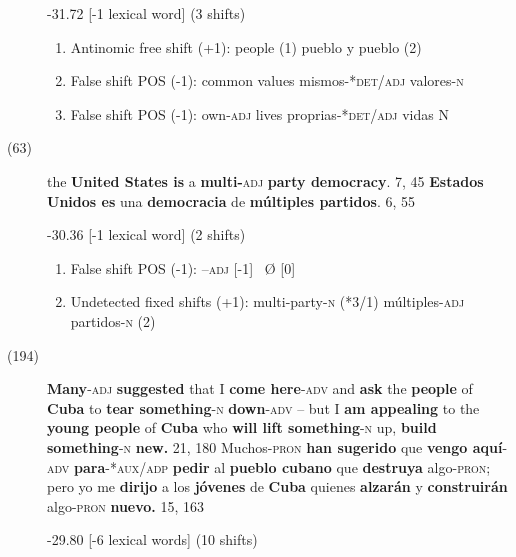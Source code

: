 \documentclass[output=paper]{langsci/langscibook}
\begin{document}
\begin{description}
    -31.72 [-1 lexical word] (3 shifts)

    \begin{enumerate}
      \item Antinomic free shift (+1): people (1) \rightarrow pueblo y pueblo (2)
      \item False shift POS (-1): common values \rightarrow mismos-*\textsc{det/adj} valores-\textsc{n}
      \item False shift POS (-1): own\textsc{-adj} lives \rightarrow proprias-*\textsc{det/adj} vidas N
    \end{enumerate}

  \item[(63)] the \textbf{United States is} a \textbf{multi-}\textsc{adj} \textbf{party democracy}. 7, 45 \rightarrow \textbf{Estados Unidos es} una \textbf{democracia} de \textbf{múltiples partidos}. 6, 55

    -30.36 [-1 lexical word] (2 shifts)

    \begin{enumerate}
      \item False shift POS (-1): --\textsc{adj} [-1] \ \rightarrow Ø [0]
      \item Undetected fixed shifts (+1): multi-party-\textsc{n} (*3/1) \rightarrow múltiples-\textsc{adj} par\-ti\-dos-\textsc{n} (2)
    \end{enumerate}

  \item[(194)] \textbf{Many}\textsc{-adj} \textbf{suggested} that I \textbf{come here}\textsc{-adv} and \textbf{ask} the \textbf{people} of \textbf{Cuba} to \textbf{tear something}\textsc{-n} \textbf{down}\textsc{-adv} -- but I \textbf{am appealing} to the \textbf{young people} of \textbf{Cuba} who \textbf{will lift something}\textsc{-n} up, \textbf{build something}\textsc{-n} \textbf{new.} 21, 180 \rightarrow Muchos\textsc{-pron} \textbf{han sugerido} que \textbf{vengo aquí}\textsc{-adv} \textbf{para}\textsc{-*aux/adp} \textbf{pedir} al \textbf{pueblo cubano} que \textbf{destruya} algo\textsc{-pron}; pero yo me \textbf{dirijo} a los \textbf{jóvenes} de \textbf{Cuba} quienes \textbf{alzarán} y \textbf{construirán} algo\textsc{-pron} \textbf{nuevo.} 15, 163

    -29.80 [-6 lexical words] (10 shifts)


\end{description}
\end{document}
